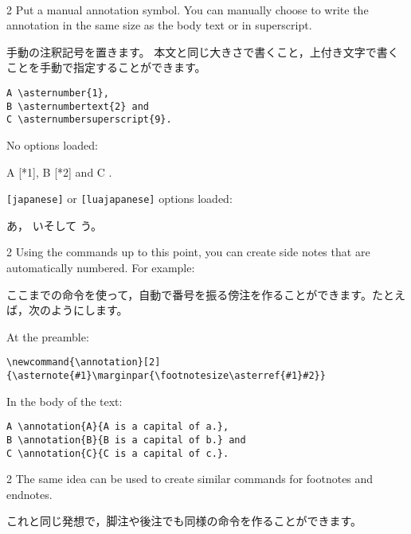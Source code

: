 \documentclass[%
fleqn,%
paper=a4paper,%
fontsize=10pt,%
open_bracket_pos=zenkakunibu_nibu,%
hanging_punctuation,%
]%
{jlreq}
\makeatletter
\DeclareRobustCommand{\linespace}{\@ifstar{\vspace{\baselineskip}}{\vspace{0.25\baselineskip}}}
\DeclareRobustCommand{\linesmash}{\@ifstar{\vspace{-\baselineskip}}{\vspace{-0.25\baselineskip}}}
\newenvironment{translateing}%
{\begin{multicolpar}{2}}
{\end{multicolpar}\vspace{\baselineskip}}
\let\code\texttt
\makeatother
\begin{document}
\linespace
{}
\ 
\ 

\begin{translateing}
Put a manual annotation symbol.
You can manually choose to write the annotation in the same size as the body text or in superscript.

手動の注釈記号を置きます。
本文と同じ大きさで書くこと，上付き文字で書くことを手動で指定することができます。
\end{translateing}

\begin{lstlisting}
A \asternumber{1}, 
B \asternumbertext{2} and 
C \asternumbersuperscript{9}.
\end{lstlisting}

No options loaded:\\
\makeatletter
\begin{macroexample}
A {\textsf{[*{1}]}}, 
B {\textsf{[*{2}]}} and 
C \@textsuperscript{\scriptsize\textsf{[*{9}]}}.
\end{macroexample}
\makeatother

\linesmash
\code{[japanese]} or \code{[luajapanese]} options loaded:\\
\begin{macroexample}
あ\asternumber{1}，
いそして 
う。
\end{macroexample}

\begin{translateing}
Using the commands up to this point, you can create side notes that are automatically numbered.
For example:

ここまでの命令を使って，自動で番号を振る傍注を作ることができます。たとえば，次のようにします。
\end{translateing}

At the preamble:
\begin{lstlisting}
\newcommand{\annotation}[2]
{\asternote{#1}\marginpar{\footnotesize\asterref{#1}#2}}
\end{lstlisting}

In the body of the text:
\begin{lstlisting}
A \annotation{A}{A is a capital of a.},
B \annotation{B}{B is a capital of b.} and
C \annotation{C}{C is a capital of c.}.
\end{lstlisting}

\begin{translateing}
The same idea can be used to create similar commands for footnotes and endnotes.

これと同じ発想で，脚注や後注でも同様の命令を作ることができます。
\end{translateing}
\end{document}
